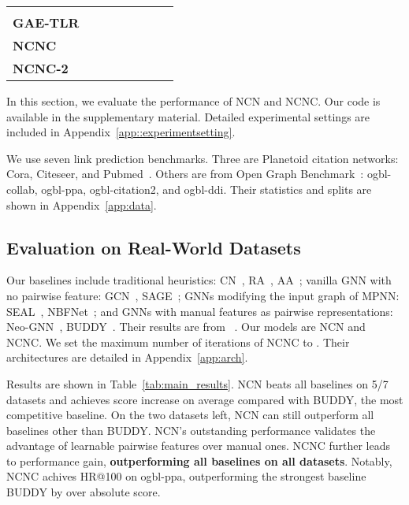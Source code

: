 \documentclass{article}
\theoremstyle{plain}
\theoremstyle{definition}
\theoremstyle{remark}
\begin{document}
\begin{table*}[th]
{\begin{tabular}{lccccccc}
         &\\
         \textbf{GAE-TLR}& 
         & 
         & 
         & 
         & 
         & 
         & 
         \\
         \fi
         \midrule
         \textbf{NCNC} &
         &
         &
         &
         &
         & 
          &
         
         \\
         \textbf{NCNC-2} & 
         & 
         & 
         & 
         &&
         &
         
         \\ 
         \bottomrule
\end{tabular}}
\vskip -0.1in
\end{table*}

In this section, we evaluate the performance of NCN and NCNC. Our code is available in the supplementary material. Detailed experimental settings are included in Appendix~\ref{app::experimentsetting}. 

We use seven link prediction benchmarks. Three are Planetoid citation networks: Cora, Citeseer, and Pubmed~\citep{Cora}. Others are from Open Graph Benchmark~\citep{OGB}: ogbl-collab, ogbl-ppa, ogbl-citation2, and ogbl-ddi. Their statistics and splits are shown in Appendix~\ref{app:data}.

\subsection{Evaluation on Real-World Datasets}

 Our baselines include traditional heuristics: CN~\citep{CommonNeighbor}, RA~\citep{RA}, AA~\citep{AA}; vanilla GNN with no pairwise feature: GCN~\citep{GCN}, SAGE~\citep{GraphSage}; GNNs modifying the input graph of MPNN: SEAL~\citep{SEAL}, NBFNet~\citep{NBFNet}; and GNNs with manual features as pairwise representations: Neo-GNN~\citep{Neo-GNN}, BUDDY~\citep{Gsketch}. Their results are from ~\citep{Gsketch}. Our models are NCN and NCNC. We set the maximum number of iterations of NCNC to . Their architectures are detailed in Appendix~\ref{app:arch}.

Results are shown in Table~\ref{tab:main_results}. NCN beats all baselines on 5/7 datasets and achieves  score increase on average compared with BUDDY, the most competitive baseline. On the two datasets left, NCN can still outperform all baselines other than BUDDY. NCN's outstanding performance validates the advantage of learnable pairwise features over manual ones. NCNC further leads to  performance gain, \textbf{outperforming all baselines on all datasets}. Notably, NCNC achives  HR@100 on ogbl-ppa, outperforming the strongest baseline BUDDY by over  absolute score.
\end{document}
